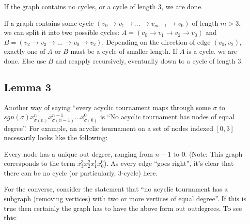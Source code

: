 \documentclass[11pt, oneside]{article} 	%
\begin{document}
If the graph contains no cycles, or a cycle of length 3, we are done.

If a graph contains some cycle $(v_0 \rightarrow v_{1} \rightarrow  ...  \rightarrow v_{m-1} \rightarrow  v_0)$ of length $m > 3$, we can split it into two possible cycles: $A = (v_0 \rightarrow  v_{1} \rightarrow v_{2} \rightarrow  v_0)$ and $B = (v_{2} \rightarrow  v_{3} \rightarrow  ... \rightarrow v_{0} \rightarrow v_{2} )$.  Depending on the direction of edge $(v_{0}, v_{2})$, exactly one of $A$ or $B$ must be a cycle of smaller length.  If $A$ is a cycle, we are done.  Else use $B$ and reapply recursively, eventually down to a cycle of length 3.

\subsection{Lemma 3}

Another way of saying ``every acyclic tournament maps through some $\sigma$ to$sgn(\sigma) x_{\sigma(n)}^nx_{\sigma(n-1)}^{n-1}  ... x_{\sigma(0)}^{0}$ is ``No acyclic tournament has nodes of equal degree''.  For example, an acyclic tournament on a set of nodes indexed $[0, 3]$ necessarily looks like the following:


Every node has a unique out degree, ranging from $n-1$ to 0.  (Note: This graph corresponds to the term $x_3^3x_2^2x_1^1x_0^0$).  As every edge ``goes right'', it's clear that there can be no cycle (or particularly, 3-cycle) here.

For the converse, consider the statement that ``no acyclic tournament has a subgraph (removing vertices) with two or more vertices of equal degree''.  If this is true then certainly the graph has to have the above form out outdegrees.  To see this:
\end{document}
